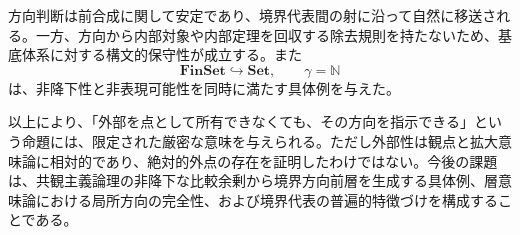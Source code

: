 \documentclass[a4paper,11pt]{ltjsarticle}
\theoremstyle{definition}
\theoremstyle{plain}
\newcommand{\Set}{\mathbf{Set}}
\newcommand{\FinSet}{\mathbf{FinSet}}
\begin{document}
方向判断は前合成に関して安定であり、境界代表間の射に沿って自然に移送される。一方、方向から内部対象や内部定理を回収する除去規則を持たないため、基底体系に対する構文的保守性が成立する。また
\[
 \FinSet\hookrightarrow\Set,
 \qquad
 \gamma=\mathbb N
\]
は、非降下性と非表現可能性を同時に満たす具体例を与えた。

以上により、「外部を点として所有できなくても、その方向を指示できる」という命題には、限定された厳密な意味を与えられる。ただし外部性は観点と拡大意味論に相対的であり、絶対的外点の存在を証明したわけではない。今後の課題は、共観主義論理の非降下な比較余剰から境界方向前層を生成する具体例、層意味論における局所方向の完全性、および境界代表の普遍的特徴づけを構成することである。



\end{document}
